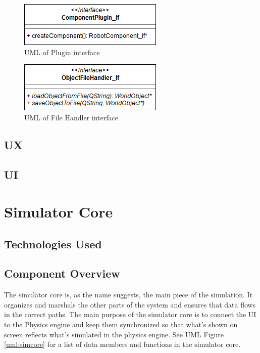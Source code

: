  \begin{figure}
 	\begin{center}
 	\includegraphics[scale=0.5]{./images_design/uml/ComponentPlugin}
 	\caption{UML of Plugin interface\label{uml:componentplugin}}
 	\end{center}
 \end{figure} 
 
 \begin{figure}
 	\begin{center}
 	\includegraphics[scale=0.5]{./images_design/uml/FileHandler_If}
 	\caption{UML of File Handler interface\label{uml:filehandle_if}}
 	\end{center}
 \end{figure} 
 
 \subsection{UX}
 
 \subsection{UI}

\section{Simulator Core}

\subsection{Technologies  Used}

\subsection{Component  Overview}
The simulator core is, as the name suggests, the main piece of the simulation. It organizes and marshals the other parts of the system and ensures that data flows in the correct paths. The main purpose of the simulator core is to connect the UI to the Physics engine and keep them synchronized so that what's shown on screen reflects what's simulated in the physics engine. See UML Figure \ref{uml:simcore} for a list of data members and functions in the simulator core.

